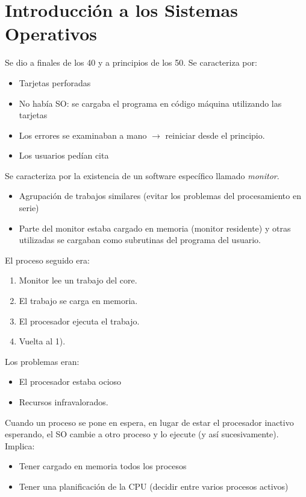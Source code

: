 \chapter{Introducción a los Sistemas Operativos}
\begin{definicion}
    Se dio a finales de los 40 y a principios de los 50. Se caracteriza por:
    \begin{itemize}
        \item Tarjetas perforadas
        \item No había SO: se cargaba el programa en código máquina utilizando las tarjetas
        \item Los errores se examinaban a mano $\longrightarrow$ reiniciar desde el principio.
        \item Los usuarios pedían cita
    \end{itemize}
\end{definicion}

\begin{definicion}
    Se caracteriza por la existencia de un software específico llamado \emph{monitor}.
    \begin{itemize}
        \item Agrupación de trabajos similares (evitar los problemas del procesamiento en serie)
        \item Parte del monitor estaba cargado en memoria (monitor residente) y otras utilizadas se cargaban como subrutinas del programa del usuario.
    \end{itemize}
    El proceso seguido era:
    \begin{enumerate}
        \item  Monitor lee un trabajo del core.
        \item El trabajo se carga en memoria.
        \item El procesador ejecuta el trabajo.
        \item Vuelta al 1).
    \end{enumerate}
    Los problemas eran:
    \begin{itemize}
        \item El procesador estaba ocioso
        \item Recursos infravalorados.
    \end{itemize}
\end{definicion}

\begin{definicion}[Multiprogramación]
    Cuando un proceso se pone en espera, en lugar de estar el procesador inactivo esperando, el SO cambie a otro proceso y lo ejecute (y así sucesivamente). Implica:
    \begin{itemize}
        \item Tener cargado en memoria todos los procesos
        \item Tener una planificación de la CPU (decidir entre varios procesos activos)
    \end{itemize}
\end{definicion}


